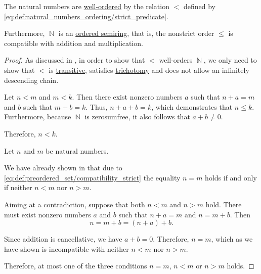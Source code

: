 \begin{proposition}\label{thm:natural_numbers_are_well_ordered}
  The natural numbers are \hyperref[def:well_ordered_set]{well-ordered} by the relation \( < \) defined by \eqref{eq:def:natural_numbers_ordering/strict_predicate}.

  Furthermore, \( \BbbN \) is an \hyperref[def:ordered_semiring]{ordered semiring}, that is, the nonstrict order \( \leq \) is compatible with addition and multiplication.
\end{proposition}
\begin{proof}
  As discussed in , in order to show that \( < \) well-orders \( \BbbN \), we only need to show that \( < \) is \hyperref[def:binary_relation/transitive]{transitive}, satisfies \hyperref[def:binary_relation/trichotomic]{trichotomy} and does not allow an infinitely descending chain.

   Let \( n < m \) and \( m < k \). Then there exist nonzero numbers \( a \) such that \( n + a = m \) and \( b \) such that \( m + b = k \). Thus, \( n + a + b = k \), which demonstrates that \( n \leq k \). Furthermore, because \( \BbbN \) is zerosumfree, it also follows that \( a + b \neq 0 \).

  Therefore, \( n < k \).

   Let \( n \) and \( m \) be natural numbers.

  We have already shown in  that due to \eqref{eq:def:preordered_set/compatibility_strict} the equality \( n = m \) holds if and only if neither \( n < m \) nor \( n > m \).

  Aiming at a contradiction, suppose that both \( n < m \) and \( n > m \) hold. There must exist nonzero numbers \( a \) and \( b \) such that \( n + a = m \) and \( n = m + b \). Then
  \begin{equation*}
    n = m + b = (n + a) + b.
  \end{equation*}

  Since addition is cancellative, we have \( a + b = 0 \). Therefore, \( n = m \), which as we have shown is incompatible with neither \( n < m \) nor \( n > m \).

  Therefore, at most one of the three conditions \( n = m \), \( n < m \) or \( n > m \) holds.


\end{proof}
